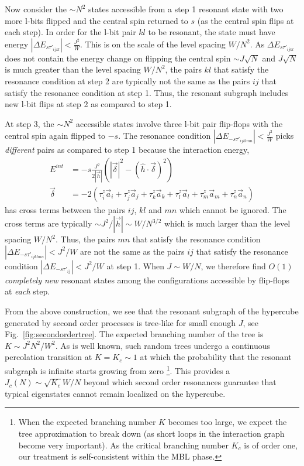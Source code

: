 \documentclass[aps,pra,twocolumn,a4paper,showpacs,superscriptaddress,floatfix,10pt]{revtex4}
\begin{document}
Now consider the $\sim  N^2$ states accessible from a step 1 resonant state with two more l-bits flipped and the central spin returned to $s$ (as the central spin flips at each step).
In order for the l-bit pair $kl$ to be resonant, the state must have energy $|\Delta E_{s\tau'_{ijkl}}| < \frac{J^2}{W}$.
This is on the scale of the level spacing $W/N^2$.
As $\Delta E_{s\tau'_{ijkl}}$ does not contain the energy change on flipping the central spin $\sim J \sqrt{N}$ and $J\sqrt{N}$ is much greater than the level spacing $W/N^2$, the pairs $kl$ that satisfy the resonance condition at step 2 are typically not the same as the pairs $ij$ that satisfy the resonance condition at step 1.
Thus, the resonant subgraph includes new l-bit flips at step 2 as compared to step 1.

At step 3, the $\sim N^2$ accessible states involve three l-bit pair flip-flops with the central spin again flipped to $-s$.
The resonance condition $|\Delta E_{-s \tau'_{ijklmn}}| < \frac{J^2}{W}$ picks \emph{different} pairs as compared to step 1 because the interaction energy,
\begin{align}
\label{eq:intenergy}
	E^{int} &= -s \frac{J^2}{2|\vec{h}|}\left( |\vec{\delta}|^2 - (\hat{h}\cdot \vec{\delta})^2 \right) \\
	\vec{\delta} &= -2 (\tau^z_i \vec{a}_i + \tau^z_j \vec{a}_j  + \tau^z_k \vec{a}_k + \tau^z_l \vec{a}_l + \tau^z_m \vec{a}_m + \tau^z_n \vec{a}_n) \nonumber
\end{align}
has cross terms between the pairs $ij$, $kl$ and $mn$ which cannot be ignored.
The cross terms are typically $\sim J^2/|\vec{h}| \sim W /N^{3/2}$ which is much larger than the level spacing $W/N^2$.
Thus,  the pairs $mn$ that satisfy the resonance condition $|\Delta E_{-s\tau'_{ijklmn}}| < J^2/W$ are not the same as the pairs $ij$ that satisfy the resonance condition $|\Delta E_{-s\tau'_{ij}}| < J^2/W$ at step 1.
When $J\sim W/N$, we therefore find $O(1)$ \emph{completely new} resonant states among the configurations accessible by flip-flops at \emph{each} step.

From the above construction, we see that the resonant subgraph of the hypercube generated by second order processes is tree-like for small enough $J$, see Fig.~\ref{fig:secondordertree}.
The expected branching number of the tree is $K \sim J^2N^2/W^2$.
As is well known, such random trees undergo a continuous percolation transition at $K = K_c \sim 1$ at which the probability that the resonant subgraph is infinite starts growing from zero \footnote{When the expected branching number $K$ becomes too large, we expect the tree approximation to break down (as short loops in the interaction graph become very important).  As the critical branching number $K_c$ is of order one, our treatment is self-consistent within the MBL phase.}.
This provides a $J_c(N) \sim \sqrt{K_c} W/N$ beyond which second order resonances guarantee that typical eigenstates cannot remain localized on the hypercube.
\end{document}
